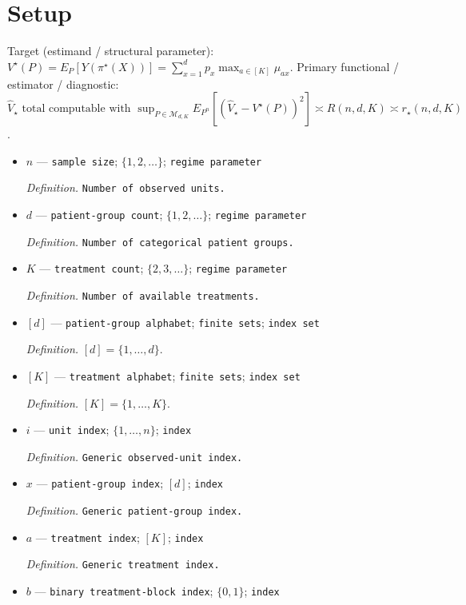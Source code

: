 \documentclass{article}
\begin{document}
\section{Setup}

Target (estimand / structural parameter): \(V^\star(P)=E_P[Y(\pi^\star(X))]=\sum_{x=1}^dp_x\max_{a\in[K]}\mu_{ax}\).
Primary functional / estimator / diagnostic: \(\widehat V_\star\text{ total computable with }\sup_{P\in\mathcal M_{d,K}}E_{P^n}[(\widehat V_\star-V^\star(P))^2]\asymp R(n,d,K)\asymp r_\star(n,d,K)\).
\begin{itemize}
  \item \(n\) --- \texttt{sample size}; \(\{1,2,\ldots\}\); \texttt{regime parameter}
  \par\smallskip\noindent\emph{Definition.} \texttt{Number of observed units.}
  \item \(d\) --- \texttt{patient-\allowbreak{}group count}; \(\{1,2,\ldots\}\); \texttt{regime parameter}
  \par\smallskip\noindent\emph{Definition.} \texttt{Number of categorical patient groups.}
  \item \(K\) --- \texttt{treatment count}; \(\{2,3,\ldots\}\); \texttt{regime parameter}
  \par\smallskip\noindent\emph{Definition.} \texttt{Number of available treatments.}
  \item \([d]\) --- \texttt{patient-\allowbreak{}group alphabet}; \texttt{finite sets}; \texttt{index set}
  \par\smallskip\noindent\emph{Definition.} \([d]=\{1,\ldots,d\}\).
  \item \([K]\) --- \texttt{treatment alphabet}; \texttt{finite sets}; \texttt{index set}
  \par\smallskip\noindent\emph{Definition.} \([K]=\{1,\ldots,K\}\).
  \item \(i\) --- \texttt{unit index}; \(\{1,\ldots,n\}\); \texttt{index}
  \par\smallskip\noindent\emph{Definition.} \texttt{Generic observed-\allowbreak{}unit index.}
  \item \(x\) --- \texttt{patient-\allowbreak{}group index}; \([d]\); \texttt{index}
  \par\smallskip\noindent\emph{Definition.} \texttt{Generic patient-\allowbreak{}group index.}
  \item \(a\) --- \texttt{treatment index}; \([K]\); \texttt{index}
  \par\smallskip\noindent\emph{Definition.} \texttt{Generic treatment index.}
  \item \(b\) --- \texttt{binary treatment-\allowbreak{}block index}; \(\{0,1\}\); \texttt{index}

\end{itemize}
\end{document}
